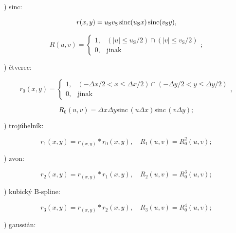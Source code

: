 ) sinc:

\begin{equation} \label{eq:4_33a}
    r(x, y) = u_\mathrm{S} v_\mathrm{S} \mathop{\mathrm{sinc}}(u_\mathrm{S} x) \mathop{\mathrm{sinc}} (v_\mathrm{S} y),
\end{equation}

\begin{equation} \label{eq:4_33b}
    R\left(u,v\right) = \left\{
    \begin{array}{cc}
    1, & \left(|u|\le u_\mathrm{S} /2\right) \cap \left(|v|\le v_\mathrm{S} /2\right) \\
    0, & \mathrm{jinak}
    \end{array}
    \right. ;
\end{equation}

) čtverec:

\begin{equation} \label{eq:4_34a}
    r_0 \left(x, y\right) = \left\{
    \begin{array}{cc}
    1, & \left(-\Delta x/2<x\le \Delta x/2\right) \cap \left(-\Delta y/2<y\le \Delta y/2\right) \\
    0, & \mathrm{jinak}
    \end{array}
    \right. ,
\end{equation}

\begin{equation} \label{eq:4_34b}
    R_0 \left(u, v\right) = \Delta x \Delta y \mathrm{sinc} \, (u \Delta x) \mathrm{sinc} \, (v \Delta y);
\end{equation}

) trojúhelník:

\begin{equation} \label{eq:4_35ab}
    r_1 \left(x, y\right) = r_(x, y) * r_0(x, y), \quad R_1(u, v) = R_0^2(u, v);
\end{equation}

) zvon:

\begin{equation} \label{eq:4_36ab}
    r_2 \left(x, y\right) = r_(x, y) * r_1(x, y), \quad R_2(u, v) = R_0^3(u, v);
\end{equation}

) kubický B-spline:

\begin{equation} \label{eq:4_37ab}
    r_3 \left(x, y\right) = r_(x, y) * r_2(x, y), \quad R_3(u, v) = R_0^4(u, v);
\end{equation}

) gaussián:

